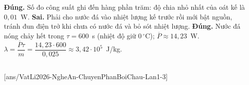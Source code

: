 \begin{ex}
{\begin{itemchoice}
				\itemch \textbf{Đúng.} Số đo công suất ghi đến hàng phần trăm: độ chia nhỏ nhất của oát kế là $0{,}01$~W.
				\itemch \textbf{Sai.} Phải cho nước đá vào nhiệt lượng kế trước rồi mới bật nguồn, tránh đun điện trở khi chưa có nước đá và bỏ sót nhiệt lượng.
				\itemch \textbf{Đúng.} Nước đá nóng chảy hết trong $\tau=600$~s (nhiệt độ giữ $0\,^\circ\text{C}$); $\overline{P}\approx 14{,}23$~W.\\
				$\lambda=\dfrac{\overline{P}\tau}{m}=\dfrac{14{,}23\cdot 600}{0{,}025}\approx 3{,}42\cdot 10^5$~J/kg.
			\end{itemchoice}
		}
	\end{ex}

	\subsection*{}
	\setcounter{ex}{0}
	[ans/VatLi2026-NgheAn-ChuyenPhanBoiChau-Lan1-3]


